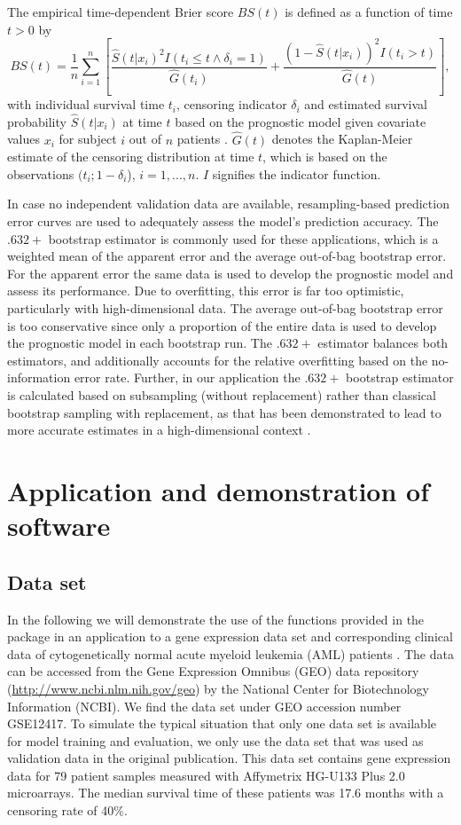 \documentclass[]{jss}
\begin{document}
The empirical time-dependent Brier score $BS(t)$ is defined as a function of time $t > 0$ by
\[
BS(t) = \frac{1}{n}\sum_{i=1}^{n}{\left[\frac{\hat{S}(t|x_i)^2I(t_i\leq t \wedge \delta_i=1)}{\hat{G}(t_i)} + \frac{(1-\hat{S}(t|x_i))^2I(t_i>t)}{\hat{G}(t)}\right]},
\]
with individual survival time $t_i$, censoring indicator $\delta_i$ and estimated survival probability $\hat{S}(t|x_i)$ at time $t$ based on the prognostic model given covariate values $x_i$ for subject $i$ out of $n$ patients \citep{graf99}.
$\hat G(t)$ denotes the Kaplan-Meier estimate of the censoring distribution at time $t$, which is based on the observations $(t_i; 1-\delta_i$), $i = 1,...,n$. $I$ signifies the indicator function. 

In case no independent validation data are available, resampling-based prediction error curves are used to adequately assess the model's prediction accuracy. The $.632+$ bootstrap estimator \citep{efron1997} is commonly used for these applications, which is a weighted mean of the apparent error and the average out-of-bag bootstrap error. For the apparent error  the same data is used to develop the prognostic model and assess its performance. Due to overfitting, this error is far too optimistic, particularly with high-dimensional data. The average out-of-bag bootstrap error is too conservative since only a proportion of the entire data is used to develop the prognostic model in each bootstrap run. 
The $.632+$ estimator balances both estimators, and additionally accounts for the relative overfitting based on the no-information error rate.
Further, in our application the $.632+$ bootstrap estimator is calculated based on subsampling (without replacement) rather than classical bootstrap sampling with replacement, as that has been demonstrated to lead to more accurate estimates in a high-dimensional context \citep{BS2008}.




\section{Application and demonstration of software}

\subsection{Data set}
\nocite{metzeler08}
In the following we will demonstrate the use of the functions provided in the  package in an application to a gene expression data set and corresponding clinical data of cytogenetically normal acute myeloid leukemia (AML) patients \citep{metzeler08}. The data can be accessed from the Gene Expression Omnibus (GEO) data repository (\url{http://www.ncbi.nlm.nih.gov/geo}) by the National Center for Biotechnology Information (NCBI). We find the data set under GEO accession number GSE12417. To simulate the typical situation that only one data set is available for model training and evaluation, we only use the data set that was used as validation data in the original publication. This data set contains gene expression data for 79 patient samples measured with Affymetrix HG-U133 Plus 2.0 microarrays. The median survival time of these patients was 17.6 months with a censoring rate of 40\%.
\end{document}
